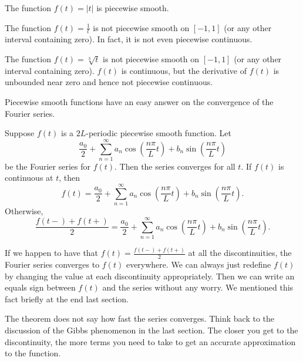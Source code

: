 \documentclass{ximera}
\begin{document}
\begin{example}
    The function $f(t) = \lvert t \lvert$ is piecewise smooth.
\end{example}

\begin{example}
    The function $f(t) = \frac{1}{t}$ is not piecewise smooth on $[-1,1]$ (or any other interval containing zero).  In fact, it is not even piecewise continuous.
\end{example}

\begin{example}
    The function $f(t) = \sqrt[3]{t}$ is not piecewise smooth on $[-1,1]$ (or any other interval containing zero).  $f(t)$ is continuous, but the derivative of $f(t)$ is unbounded near zero and hence not piecewise continuous.
\end{example}

Piecewise smooth functions have an easy answer on the convergence
of the Fourier series.

\begin{theorem}{}
    Suppose $f(t)$ is a $2L$-periodic piecewise smooth function. Let
    \begin{equation*}
        \frac{a_0}{2} + \sum_{n=1}^\infty a_n \cos \left( \frac{n \pi}{L} t \right) + b_n \sin \left( \frac{n \pi}{L} t \right)
    \end{equation*}
    be the Fourier series for $f(t)$.  Then the series converges for all $t$.  If $f(t)$ is continuous at $t$, then
    \begin{equation*}
        f(t) = \frac{a_0}{2} + \sum_{n=1}^\infty a_n \cos \left( \frac{n \pi}{L} t \right) + b_n \sin \left( \frac{n \pi}{L} t \right) .
    \end{equation*}
    Otherwise,
    \begin{equation*}
        \frac{f(t-)+f(t+)}{2} = \frac{a_0}{2} + \sum_{n=1}^\infty a_n \cos \left( \frac{n \pi}{L}  t \right) + b_n \sin \left( \frac{n \pi}{L} t \right) .
    \end{equation*}
\end{theorem}

If we happen to have that $f(t) = \frac{f(t-)+f(t+)}{2}$ at all the discontinuities, the Fourier series converges to $f(t)$ everywhere.  We can always just redefine $f(t)$ by changing the value at each discontinuity appropriately.  Then we can write an equals sign between $f(t)$ and the series without any worry. We mentioned this fact briefly at the end last section.

The theorem does not say how fast the series converges. Think back to the discussion of the Gibbs phenomenon in the last section. The closer you get to the discontinuity, the more terms you need to take to get an accurate approximation to the function.
\end{document}
